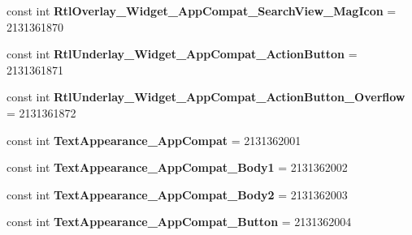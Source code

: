 \begin{DoxyCompactItemize}
\item 
\mbox{\label{class_pinned_app_1_1_droid_1_1_resource_1_1_style_aea1fa23255cf313966213a4150e0f1d1}} 
const int {\bfseries Rtl\+Overlay\+\_\+\+Widget\+\_\+\+App\+Compat\+\_\+\+Search\+View\+\_\+\+Mag\+Icon} = 2131361870
\item 
\mbox{\label{class_pinned_app_1_1_droid_1_1_resource_1_1_style_a21a2b908edcf95de98f95e33177802e2}} 
const int {\bfseries Rtl\+Underlay\+\_\+\+Widget\+\_\+\+App\+Compat\+\_\+\+Action\+Button} = 2131361871
\item 
\mbox{\label{class_pinned_app_1_1_droid_1_1_resource_1_1_style_a6cc6f1ad27496646080b39884104cc90}} 
const int {\bfseries Rtl\+Underlay\+\_\+\+Widget\+\_\+\+App\+Compat\+\_\+\+Action\+Button\+\_\+\+Overflow} = 2131361872
\item 
\mbox{\label{class_pinned_app_1_1_droid_1_1_resource_1_1_style_a8c88ecd32207e3e5e924dad52d20cfe2}} 
const int {\bfseries Text\+Appearance\+\_\+\+App\+Compat} = 2131362001
\item 
\mbox{\label{class_pinned_app_1_1_droid_1_1_resource_1_1_style_ad90d15a9abe536bdd4d688c3bcccc8f7}} 
const int {\bfseries Text\+Appearance\+\_\+\+App\+Compat\+\_\+\+Body1} = 2131362002
\item 
\mbox{\label{class_pinned_app_1_1_droid_1_1_resource_1_1_style_a745a088406dec5f83a370e809b6ba3cc}} 
const int {\bfseries Text\+Appearance\+\_\+\+App\+Compat\+\_\+\+Body2} = 2131362003
\item 
\mbox{\label{class_pinned_app_1_1_droid_1_1_resource_1_1_style_a1f9a78db07f71b6d2d670101ffd02019}} 
const int {\bfseries Text\+Appearance\+\_\+\+App\+Compat\+\_\+\+Button} = 2131362004
\item 
\mbox{\label{class_pinned_app_1_1_droid_1_1_resource_1_1_style_ac2f1d8a7e01cbc3baab26da2d345d668}} 

\end{DoxyCompactItemize}
